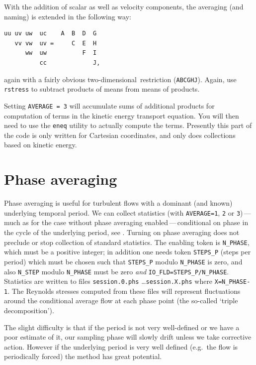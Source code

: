 \documentclass[11pt]{report}
\newcommand\twod{two-di\-men\-sion\-al}
\newcommand{\eg}{e.g.\ } \newcommand{\CC}{\mathrm{c.c.}}
\begin{document}
With the addition of scalar as well as velocity components, the
averaging (and naming) is extended in the following way:
%
{\small
\begin{verbatim}
uu uv uw  uc    A  B  D  G
   vv vw  uv =     C  E  H
      ww  uw          F  I
          cc             J,
\end{verbatim}
}
%
\noindent
again with a fairly obvious \twod\ restriction (\verb|ABCGHJ|).
Again, use \verb|rstress| to subtract products of means from means
of products.

Setting \verb+AVERAGE = 3+ will accumulate sums of additional products
for computation of terms in the kinetic energy transport equation. You
will then need to use the \verb+eneq+ utility to actually compute the
terms. Presently this part of the code is only written for Cartesian
coordinates, and only does collections based on kinetic energy.

\section{Phase averaging}
\label{sec.phase}

Phase averaging is useful for turbulent flows with a dominant (and
known) underlying temporal period.  We can collect statistics (with
\verb|AVERAGE=1|, \verb|2| or \verb|3|)\,---\,much as for the case
without phase averaging enabled\,---\,conditional on phase in the
cycle of the underlying period, see \citet{rehu72}.  Turning
on phase averaging does not preclude or stop collection of standard
statistics.  The enabling token is \verb|N_PHASE|, which must be a
positive integer; in addition one needs token \verb|STEPS_P| (steps
per period) which must be chosen such that \verb|STEPS_P| modulo
\verb|N_PHASE| is zero, and also \verb|N_STEP| modulo \verb|N_PHASE|
must be zero \emph{and} \verb|IO_FLD=STEPS_P/N_PHASE|.  Statistics are
written to files \verb|session.0.phs| \ldots \verb|session.X.phs|
where \verb|X=N_PHASE-1|.  The Reynolds stresses computed from these
files will represent fluctuations around the conditional average flow
at each phase point (the so-called `triple decomposition').

The slight difficulty is that if the period is not very well-defined
or we have a poor estimate of it, our sampling phase will slowly drift
unless we take corrective action.  However if the underlying period is
very well defined (\eg the flow is periodically forced) the method has
great potential.
\end{document}
